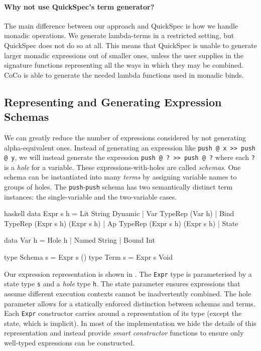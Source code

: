 \paragraph{Why not use QuickSpec's term generator?}
The main difference between our approach and QuickSpec is how we
handle monadic operations.  We generate lambda-terms in a restricted
setting, but QuickSpec does not do so at all.  This means that
QuickSpec is unable to generate larger monadic expressions out of
smaller ones, unless the user supplies in the signature functions
representing all the ways in which they may be combined.  CoCo is able
to generate the needed lambda functions used in monadic binds.

\subsection{Representing and Generating Expression Schemas}
\label{sec:coco-hiw-gen}

We can greatly reduce the number of expressions considered by not
generating alpha-equivalent ones.  Instead of generating an expression
like \verb|push @ x >> push @ y|, we will instead generate the
expression \verb|push @ ? >> push @ ?| where each \verb|?| is a
\emph{hole} for a variable.  These expressions-with-holes are called
\emph{schemas}.  One schema can be instantiated into many \emph{terms}
by assigning variable names to groups of holes.  The
\verb|push|-\verb|push| schema has two semantically distinct term
instances: the single-variable and the two-variable cases.

\begin{listing}
\centering
\begin{cminted}{haskell}
data Expr s h
  = Lit  String Dynamic
  | Var  TypeRep (Var h)
  | Bind TypeRep (Expr s h) (Expr s h)
  | Ap   TypeRep (Expr s h) (Expr s h)
  | State

data Var h = Hole h | Named String | Bound Int

type Schema s = Expr s ()
type Term   s = Expr s Void
\end{cminted}
\caption{Representation of Haskell expressions.}
\label{lst:exprrep}
\end{listing}

Our expression representation is shown in .  The
\verb|Expr| type is parameterised by a state type \verb|s| and a
\emph{hole} type \verb|h|.  The state parameter ensures expressions
that assume different execution contexts cannot be inadvertently
combined.  The hole parameter allows for a statically enforced
distinction between schemas and terms.  Each \verb|Expr| constructor
carries around a representation of its type (except the state, which
is implicit).  In most of the implementation we hide the details of
this representation and instead provide \emph{smart constructor}
functions to ensure only well-typed expressions can be constructed.

